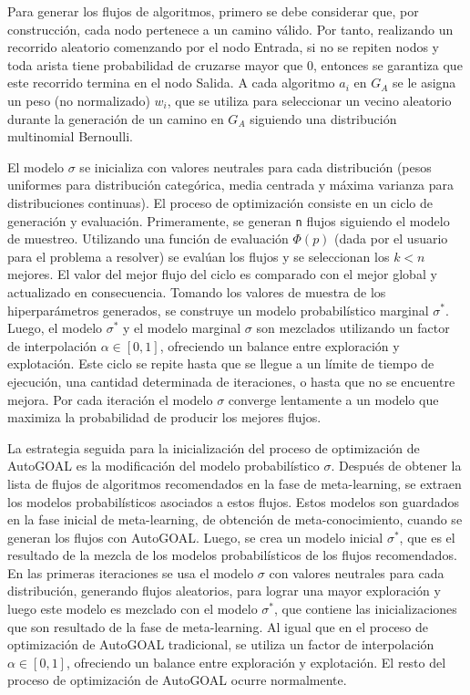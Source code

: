 Para generar los flujos de algoritmos, primero se debe considerar que, por construcción, cada nodo pertenece a un camino válido. Por tanto, realizando un recorrido aleatorio comenzando por el nodo Entrada, si no se repiten nodos y toda arista tiene probabilidad de cruzarse mayor que 0, entonces se garantiza que este recorrido termina en el nodo Salida. A cada algoritmo $a_i$ en $G_A$ se le asigna un peso (no normalizado) $w_i$, que se utiliza para seleccionar un vecino aleatorio durante la generación de un camino en $G_A$ siguiendo una distribución multinomial Bernoulli.

El modelo $\sigma$ se inicializa con valores neutrales para cada distribución (pesos uniformes para distribución categórica, media centrada y máxima varianza para distribuciones continuas). El proceso de optimización consiste en un ciclo de generación y evaluación. Primeramente, se generan \texttt{n} flujos siguiendo el modelo de muestreo. Utilizando una función de evaluación $\Phi(p)$ (dada por el usuario para el problema a resolver) se evalúan los flujos y se seleccionan los $k < n$ mejores. El valor del mejor flujo del ciclo es comparado con el mejor global y actualizado en consecuencia. Tomando los valores de muestra de los hiperparámetros generados, se construye un modelo probabilístico marginal $\sigma^*$. Luego, el modelo $\sigma^*$ y el modelo marginal $\sigma$ son mezclados utilizando un factor de interpolación $\alpha \in [0, 1]$, ofreciendo un balance entre exploración y explotación. Este ciclo se repite hasta que se llegue a un límite de tiempo de ejecución, una cantidad determinada de iteraciones, o hasta que no se encuentre mejora. Por cada iteración el modelo $\sigma$ converge lentamente a un modelo que maximiza la probabilidad de producir los mejores flujos. 

La estrategia seguida para la inicialización del proceso de optimización de AutoGOAL es la modificación del modelo probabilístico $\sigma$. Después de obtener la lista de flujos de algoritmos recomendados en la fase de meta-learning, se extraen los modelos probabilísticos asociados a estos flujos. Estos modelos son guardados en la fase inicial de meta-learning, de obtención de meta-conocimiento, cuando se generan los flujos con AutoGOAL. Luego, se crea un modelo inicial $\sigma^*$, que es el resultado de la mezcla de los modelos probabilísticos de los flujos recomendados. En las primeras iteraciones se usa el modelo $\sigma$ con valores neutrales para cada distribución, generando flujos aleatorios, para lograr una mayor exploración y luego este modelo es mezclado con el modelo $\sigma^*$, que contiene las inicializaciones que son resultado de la fase de meta-learning. Al igual que en el proceso de optimización de AutoGOAL tradicional, se utiliza un factor de interpolación $\alpha \in [0, 1]$, ofreciendo un balance entre exploración y explotación. El resto del proceso de optimización de AutoGOAL ocurre normalmente.

